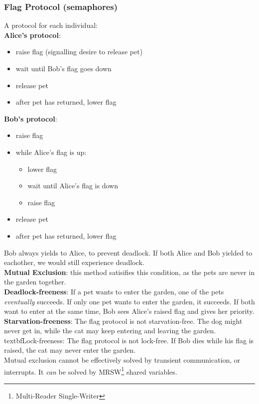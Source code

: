 \documentclass{article}
\begin{document}
\subsubsection{Flag Protocol (semaphores)}
A protocol for each individual:
\\\textbf{Alice's protocol}:
\begin{itemize}
    \item raise flag (signalling desire to release pet)
    \item wait until Bob's flag goes down
    \item release pet
    \item after pet has returned, lower flag
\end{itemize}
\textbf{Bob's protocol}:
\begin{itemize}
    \item raise flag
    \item while Alice's flag is up:
    \begin{itemize}
        \item lower flag
        \item wait until Alice's flag is down
        \item raise flag
    \end{itemize}
    \item release pet
    \item after pet has returned, lower flag
\end{itemize}
Bob always yields to Alice, to prevent deadlock. If both Alice and Bob yielded to eachother, we would still experience deadlock.
\\\textbf{Mutual Exclusion}: this method satisifies this condition, as the pets are never in the garden together.
\\\textbf{Deadlock-freeness}: If a pet wants to enter the garden, one of the pets \textit{eventually} succeeds. If only one pet wants to enter the garden, it succeeds. If both want to enter at the same time, Bob sees Alice's raised flag and gives her priority.
\\\textbf{Starvation-freeness}: The flag protocol is not starvation-free. The dog might never get in, while the cat may keep entering and leaving the garden.
\\textbf{Lock-freeness}: The flag protocol is not lock-free. If Bob dies while his flag is raised, the cat may never enter the garden.
\\Mutual exclusion cannot be effectively solved by transient communication, or interrupts. It \textit{can} be solved by MRSW\footnote{Multi-Reader Single-Writer} shared variables.
\end{document}

